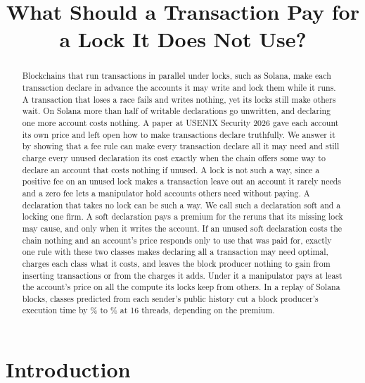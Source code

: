 \documentclass[conference,compsoc]{IEEEtran}
\numberwithin{equation}{section}
\theoremstyle{plain}
\theoremstyle{definition}
\theoremstyle{remark}
\begin{document}
\title{What Should a Transaction Pay for a Lock It Does Not Use?}

\author{
}

\maketitle

\begin{abstract}
Blockchains that run transactions in parallel under locks, such as Solana, make each transaction declare in advance the accounts it may write and lock them while it runs. A transaction that loses a race fails and writes nothing, yet its locks still make others wait. On Solana more than half of writable declarations go unwritten, and declaring one more account costs nothing. A paper at USENIX Security 2026 gave each account its own price and left open how to make transactions declare truthfully. We answer it by showing that a fee rule can make every transaction declare all it may need and still charge every unused declaration its cost exactly when the chain offers some way to declare an account that costs nothing if unused. A lock is not such a way, since a positive fee on an unused lock makes a transaction leave out an account it rarely needs and a zero fee lets a manipulator hold accounts others need without paying. A declaration that takes no lock can be such a way. We call such a declaration soft and a locking one firm. A soft declaration pays a premium for the reruns that its missing lock may cause, and only when it writes the account. If an unused soft declaration costs the chain nothing and an account's price responds only to use that was paid for, exactly one rule with these two classes makes declaring all a transaction may need optimal, charges each class what it costs, and leaves the block producer nothing to gain from inserting transactions or from the charges it adds. Under it a manipulator pays at least the account's price on all the compute its locks keep from others. In a replay of Solana blocks, classes predicted from each sender's public history cut a block producer's execution time by \freeMenuHiCutSixteenB\% to \freeMenuLoCutSixteenA\% at 16 threads, depending on the premium.
\end{abstract}

\section{Introduction}\label{sec:intro}
\end{document}
